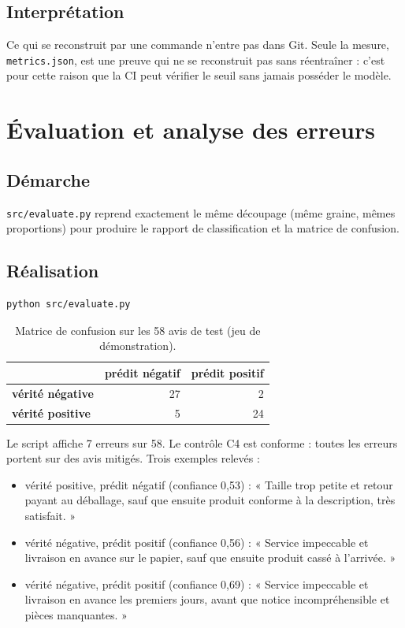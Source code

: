 \documentclass[11pt,a4paper]{article}
\begin{document}
\subsection{Interprétation}

Ce qui se reconstruit par une commande n'entre pas dans Git. Seule la mesure, \texttt{metrics.json}, est une preuve qui ne se reconstruit pas sans réentraîner : c'est pour cette raison que la CI peut vérifier le seuil sans jamais posséder le modèle.

\section{Évaluation et analyse des erreurs}

\subsection{Démarche}

\texttt{src/evaluate.py} reprend exactement le même découpage (même graine, mêmes proportions) pour produire le rapport de classification et la matrice de confusion.

\subsection{Réalisation}

\begin{verbatim}
python src/evaluate.py
\end{verbatim}

\begin{table}[H]
\centering
\begin{tabular}{lrr}
\toprule
 & \textbf{prédit négatif} & \textbf{prédit positif} \\
\midrule
\textbf{vérité négative} & 27 & 2 \\
\textbf{vérité positive} & 5 & 24 \\
\bottomrule
\end{tabular}
\caption{Matrice de confusion sur les 58 avis de test (jeu de démonstration).}
\end{table}

Le script affiche 7 erreurs sur 58. Le contrôle C4 est conforme : toutes les erreurs portent sur des avis mitigés. Trois exemples relevés :

\begin{itemize}[leftmargin=*]
  \item vérité positive, prédit négatif (confiance 0,53) : « Taille trop petite et retour payant au déballage, sauf que ensuite produit conforme à la description, très satisfait. »
  \item vérité négative, prédit positif (confiance 0,56) : « Service impeccable et livraison en avance sur le papier, sauf que ensuite produit cassé à l'arrivée. »
  \item vérité négative, prédit positif (confiance 0,69) : « Service impeccable et livraison en avance les premiers jours, avant que notice incompréhensible et pièces manquantes. »
\end{itemize}
\end{document}
